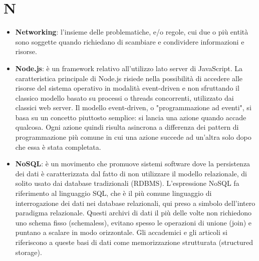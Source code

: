 \section{N}
\begin{itemize}
	\item
	\textbf{Networking}: l’insieme delle problematiche, e/o regole, cui due o più entità sono soggette quando richiedano di scambiare e condividere informazioni e risorse.  
	\item
	\textbf{Node.js}: è un framework relativo all'utilizzo lato server di JavaScript.
	 La caratteristica principale di Node.js risiede nella possibilità di accedere alle risorse del sistema operativo in modalità event-driven e non sfruttando il classico modello basato su processi o threads concorrenti, utilizzato dai classici web server. Il modello event-driven, o "programmazione ad eventi", si basa su un concetto piuttosto semplice: si lancia una azione quando accade qualcosa. Ogni azione quindi risulta asincrona a differenza dei pattern di programmazione più comune in cui una azione succede ad un'altra solo dopo che essa è stata completata.
	 \item
	 \textbf{NoSQL}: è un movimento che promuove sistemi software dove la persistenza dei dati è caratterizzata dal fatto di non utilizzare il modello relazionale, di solito usato dai database tradizionali (RDBMS). L'espressione NoSQL fa riferimento al linguaggio SQL, che è il più comune linguaggio di interrogazione dei dati nei database relazionali, qui preso a simbolo dell'intero paradigma relazionale.
	 Questi archivi di dati il più delle volte non richiedono uno schema fisso (schemaless), evitano spesso le operazioni di unione (join) e puntano a scalare in modo orizzontale. Gli accademici e gli articoli si riferiscono a queste basi di dati come memorizzazione strutturata (structured storage).
\end{itemize}